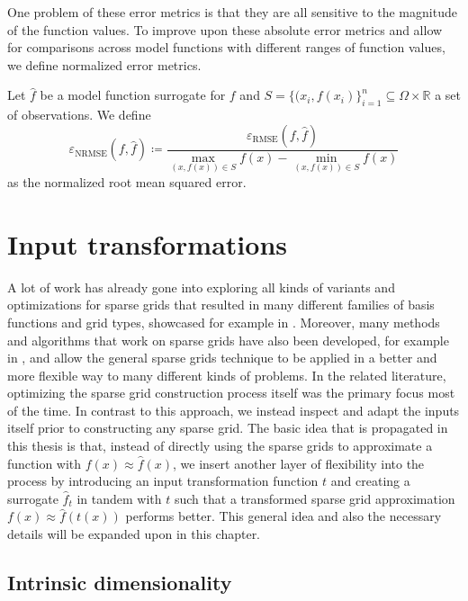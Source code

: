 \documentclass[
  a4paper,  %
  twoside,  %
  bibliography=totoc,
  headsepline,
  cleardoublepage=empty,
  parskip=half,
  draft=false
]{scrbook}
\begin{document}
One problem of these error metrics is that they are all sensitive to the magnitude of the function values.
To improve upon these absolute error metrics and allow for comparisons across model functions with different ranges of function values, we define normalized error metrics.

\begin{definition}
Let $\hat{f}$ be a model function surrogate for $f$ and $S=\{(x_i, f(x_i)\}_{i=1}^n \subseteq \Omega \times \mathds{R}$ a set of observations.
We define
\begin{equation}
\varepsilon_{\mathrm{NRMSE}}(f, \hat{f}) \coloneqq \frac{\varepsilon_{\mathrm{RMSE}}(f, \hat{f})}{\max\limits_{(x, f(x)) \in S} f(x) - \min\limits_{(x, f(x)) \in S} f(x)}
\end{equation}
as the normalized root mean squared error.
\end{definition}


\chapter{Input transformations}
\label{chap:c3}

A lot of work has already gone into exploring all kinds of variants and optimizations for sparse grids that resulted in many different families of basis functions and grid types, showcased for example in \cite{Feuersaenger2010, Valentin2019}.
Moreover, many methods and algorithms that work on sparse grids have also been developed, for example in \cite{Gerstner1998, Garcke2001, Pflueger2010, Valentin2019, Rehme2021}, and allow the general sparse grids technique to be applied in a better and more flexible way to many different kinds of problems.
In the related literature, optimizing the sparse grid construction process itself was the primary focus most of the time.
In contrast to this approach, we instead inspect and adapt the inputs itself prior to constructing any sparse grid.
The basic idea that is propagated in this thesis is that, instead of directly using the sparse grids to approximate a function with $f(x) \approx \hat{f}(x)$, we insert another layer of flexibility into the process by introducing an input transformation function $t$ and creating a surrogate $\hat{f}_t$ in tandem with $t$ such that a transformed sparse grid approximation $f(x) \approx \hat{f}(t(x))$ performs better.
This general idea and also the necessary details will be expanded upon in this chapter.

\section{Intrinsic dimensionality}
\label{sec:intrinsic}
\end{document}
